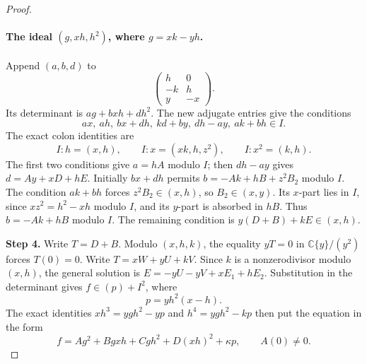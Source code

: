 \begin{proof}
\paragraph{The ideal $(g,xh,h^2)$, where $g=xk-yh$.}
Append $(a,b,d)$ to
\[
                         \begin{pmatrix}h&0\\-k&h\\y&-x\end{pmatrix}.
\]
Its determinant is $ag+bxh+dh^2$. The new adjugate
entries give the conditions
\[
       ax,\ ah,\ bx+dh,\ kd+by,\ dh-ay,\ ak+bh\in I.
\]
The exact colon identities are
\[
 I:h=(x,h),\qquad I:x=(xk,h,z^2),\qquad I:x^2=(k,h).
\]
The first two conditions give $a=hA$ modulo $I$;
then $dh-ay$ gives $d=Ay+xD+hE$.
Initially $bx+dh$ permits
$b=-Ak+hB+z^2B_2$ modulo $I$.
The condition $ak+bh$ forces $z^2B_2\in(x,h)$,
so $B_2\in(x,y)$. Its $x$-part lies in $I$, since
$xz^2=h^2-xh$ modulo $I$, and its $y$-part is
absorbed in $hB$. Thus $b=-Ak+hB$ modulo $I$.
The remaining condition is $y(D+B)+kE\in(x,h)$.

\noindent\textbf{Step 4.} Write $T=D+B$. Modulo $(x,h,k)$, the equality
$yT=0$ in $\mathbb C\{y\}/(y^2)$ forces $T(0)=0$.
Write $T=xW+yU+kV$. Since $k$ is a nonzerodivisor
modulo $(x,h)$, the general solution is
$E=-yU-yV+xE_1+hE_2$. Substitution in the determinant
gives $f\in(p)+I^2$, where
\[
                            p=yh^2(x-h).
\]
The exact identities
$xh^3=ygh^2-yp$ and $h^4=ygh^2-kp$ then put the
equation in the form
\[
 f=A g^2+B gxh+Cgh^2+D(xh)^2+\kappa p,
                       \qquad A(0)\ne0.              \tag{4.49b}
\]


\end{proof}

